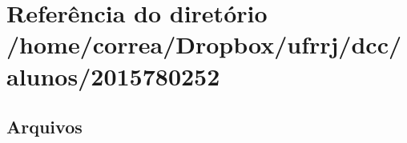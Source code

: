 \section{Referência do diretório /home/correa/\+Dropbox/ufrrj/dcc/alunos/2015780252}
\label{dir_2ead4707c3e30e5e25af4c8a674d4e06}
\subsection*{Arquivos}
\begin{DoxyCompactItemize}
\end{DoxyCompactItemize}
